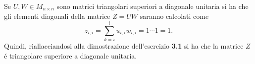 Se $U,W \in M_{n \times n}$ sono matrici triangolari superiori a diagonale unitaria si ha che gli elementi diagonali della matrice $Z=UW$ saranno calcolati come
\[
z_{i,i} = \sum_{k=i}^{i} u_{i,i}w_{i,i} = 1 \cdots 1 = 1.
\]
Quindi, riallacciandosi alla dimostrazione dell'esercizio \textbf{3.1} si ha che la matrice $Z$ \'e triangolare superiore a diagonale unitaria.
